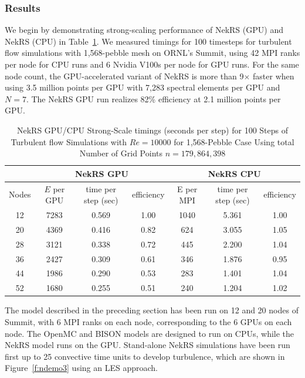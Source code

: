 \subsubsection{Results}
We begin by demonstrating strong-scaling performance of NekRS (GPU) and NekRS (CPU) in Table~\ref{tab:nekrs}.
We measured timings for 100 timesteps for turbulent flow simulations with 1,568-pebble mesh on ORNL’s Summit, 
using 42 MPI ranks per node for CPU runs and 6 Nvidia V100s per node for GPU runs. 
For the same node count, the GPU-accelerated variant of NekRS is more than 9$\times$ faster when using
3.5 million points per GPU with 7,283 spectral elements per GPU and $N=7$. 
The NekRS GPU run realizes 82\% efficiency at 2.1 million points per GPU.


\begin{table}
  \centering
  \begin{tabular}{c|ccc||ccc}
    \hline \hline
  \multicolumn{1}{c|}{ } &
  \multicolumn{3}{|c||}{NekRS GPU}  &
  \multicolumn{3}{|c}{NekRS CPU} \\
  \hline
  \hline
    Nodes  &  $E$ per GPU & time per step (sec) & efficiency & E per MPI& time per step (sec) & efficiency \\
  \hline
    12 & 7283 & 0.569 & 1.00 & 1040 & 5.361  & 1.00\\
    20 & 4369 & 0.416 & 0.82 & 624 & 3.055  & 1.05\\
    28 & 3121 & 0.338 & 0.72 & 445 & 2.200  & 1.04\\
    36 & 2427 & 0.309 & 0.61 & 346 & 1.876  & 0.95\\
    44 & 1986 & 0.290 & 0.53 & 283 & 1.401  & 1.04\\
    52 & 1680 & 0.255 & 0.51 & 240 & 1.204  & 1.02\\
    \hline \hline
  \end{tabular}
  \caption{NekRS GPU/CPU Strong-Scale timings (seconds per step) for 100 Steps of Turbulent flow Simulations
   with $Re=10000$ for 1,568-Pebble Case Using total Number of Grid Points $n=179,864,398$}
  \label{tab:nekrs}
\end{table}

The model described in the preceding section has been run on 12 and 20 nodes of Summit, with 6 MPI ranks on each node, corresponding to the 6 GPUs on each node. The OpenMC and BISON models are designed to run on CPUs, while the NekRS model runs on the GPU. Stand-alone NekRS simulations have been run first up to 25 convective time units to develop turbulence, which are shown in Figure~\ref{f:ndemo3} using an LES approach.

